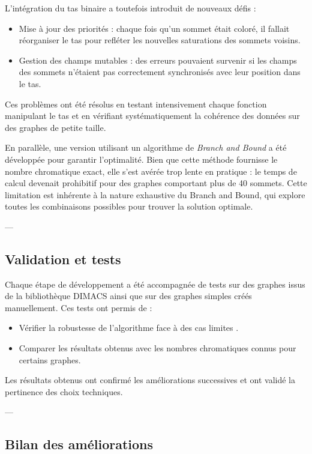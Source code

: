 \documentclass[11pt]{article}
\begin{document}
L'intégration du tas binaire a toutefois introduit de nouveaux défis :
\begin{itemize}
    \item Mise à jour des priorités : chaque fois qu’un sommet était coloré, il fallait réorganiser le tas pour refléter les nouvelles saturations des sommets voisins.
    \item Gestion des champs mutables : des erreurs pouvaient survenir si les champs des sommets n’étaient pas correctement synchronisés avec leur position dans le tas.
\end{itemize}

Ces problèmes ont été résolus en testant intensivement chaque fonction manipulant le tas et en vérifiant systématiquement la cohérence des données sur des graphes de petite taille.

En parallèle, une version utilisant un algorithme de \textit{Branch and Bound} a été développée pour garantir l'optimalité. Bien que cette méthode fournisse le nombre chromatique exact, elle s’est avérée trop lente en pratique : le temps de calcul devenait prohibitif pour des graphes comportant plus de 40 sommets. Cette limitation est inhérente à la nature exhaustive du Branch and Bound, qui explore toutes les combinaisons possibles pour trouver la solution optimale.

---

\subsection{Validation et tests}

Chaque étape de développement a été accompagnée de tests sur des graphes issus de la bibliothèque DIMACS ainsi que sur des graphes simples créés manuellement. Ces tests ont permis de :
\begin{itemize}
    \item Vérifier la robustesse de l’algorithme face à des cas limites .
    \item Comparer les résultats obtenus avec les nombres chromatiques connus pour certains graphes.
\end{itemize}

Les résultats obtenus ont confirmé les améliorations successives et ont validé la pertinence des choix techniques.

---

\subsection{Bilan des améliorations}
\end{document}

